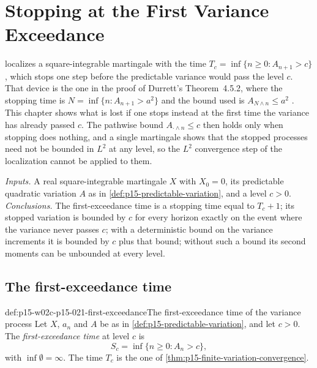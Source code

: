\chapter{Stopping at the First Variance Exceedance}
\label{sec:p15-w02c-p15-021-first-exceedance}

 localizes a square-integrable
martingale with the time \(T_c=\inf\{n\geq0:A_{n+1}>c\}\), which stops
one step before the predictable variance would pass the level \(c\).
That device is the one in the proof of Durrett's Theorem~4.5.2, where the
stopping time is \(N=\inf\{n:A_{n+1}>a^2\}\) and the bound used is
\(A_{N\wedge n}\leq a^2\) \cite[thm.~4.5.2, p.~240]{DurrettPTEAuthor2019}.
This chapter shows what is lost if one stops instead at the first time
the variance has already passed \(c\). The pathwise bound
\(A_{\cdot\wedge n}\leq c\) then holds only when stopping does nothing,
and a single martingale shows that the stopped processes need not be
bounded in \(L^2\) at any level, so the \(L^2\) convergence step of the
localization cannot be applied to them.

\emph{Inputs.} A real square-integrable martingale \(X\) with
\(X_0=0\), its predictable quadratic variation \(A\) as in
\cref{def:p15-predictable-variation}, and a level \(c>0\).
\emph{Conclusions.} The first-exceedance time is a stopping time equal
to \(T_c+1\); its stopped variation is bounded by \(c\) for every
horizon exactly on the event where the variance never passes \(c\);
with a deterministic bound on the variance increments it is bounded by
\(c\) plus that bound; without such a bound its second moments can be
unbounded at every level.

\section{The first-exceedance time}
\label{sec:p15-w02c-p15-021-definition}

\begin{hbdefinition}{def:p15-w02c-p15-021-first-exceedance}{The first-exceedance time of the variance process}
Let \(X\), \(a_n\) and \(A\) be as in
\cref{def:p15-predictable-variation}, and let \(c>0\). The
\emph{first-exceedance time} at level \(c\) is
\[
                       S_c=\inf\{n\geq0:A_n>c\},
\]
with \(\inf\emptyset=\infty\). The time \(T_c\) is the one of
\cref{thm:p15-finite-variation-convergence}.
\end{hbdefinition}

